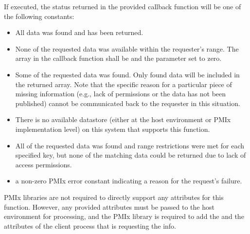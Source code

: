 \begin{arglist}
\end{arglist}

\returnsimplenb

If executed, the status returned in the provided callback function will be one of the following constants:

\begin{itemize}
\item {} All data was found and has been returned.

\item {} None of the requested data was available within the requester's range. The  array in the callback function shall be  and the  parameter set to zero.

\item {} Some of the requested data was found.
Only found data will be included in the returned  array. Note that the specific reason for a particular piece of missing information (e.g., lack of permissions or the data has not been published) cannot be communicated back to the requester in this situation.

\item {} There is no available datastore (either at the host environment or \ac{PMIx} implementation level) on this system that supports this function.

\item {} All of the requested data was found and range restrictions were met for each specified key, but none of the matching data could be returned due to lack of access permissions.

\item a non-zero \ac{PMIx} error constant indicating a reason for the request's failure.
\end{itemize}

\reqattrstart
\ac{PMIx} libraries are not required to directly support any attributes for this function. However, any provided attributes must be passed to the host environment for processing, and the \ac{PMIx} library is required to add the  and the  attributes of the client process that is requesting the info.

